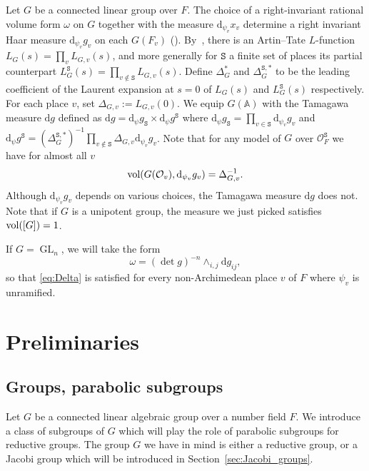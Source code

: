 \documentclass[letterpaper,11pt]{amsart}
\newcommand{\bA}{\mathbb{A}}
\newcommand{\cO}{\mathcal{O}}
\newcommand{\rd}{\mathrm{d}}
\newcommand{\tS}{\mathtt{S}}
\newcommand{\<}{\negthickspace}
\DeclareMathOperator{\GL}{GL}
\theoremstyle{definition}
\theoremstyle{plain}
\theoremstyle{remark}
\numberwithin{equation}{section}
\begin{document}
Let $G$ be a connected linear group over $F$.
The choice of a right-invariant rational volume
form $\omega$ on $G$ together with the measure $\rd_{\psi_v} x_v$ determine a right invariant Haar measure $\rd_{\psi_v} g_v$ on each $G(F_v)$ (\cite{Wei}).
By~\cite{Gro97}, there is an Artin--Tate $L$-function $L_{G}(s)=\prod_v
L_{G,v}(s)$, and more generally for $\tS$ a finite set of places its partial counterpart $L_{G}^{\tS}(s)=\prod_{v \notin \tS}
L_{G,v}(s)$. Define $\Delta_{G}^*$ and
$\Delta_{G}^{\tS,*}$ to be the leading coefficient of the Laurent expansion
at $s=0$ of $L_{G}(s)$ and $L_{G}^{\tS}(s)$ respectively. For each place $v$,
set $\Delta_{G,v}:=L_{G,v}(0)$. We equip $G(\bA)$ with the Tamagawa
measure $\rd g$ defined as $\rd g=\rd_\psi g_{\tS} \times \rd_\psi g^{\tS}$ where $\rd_\psi
g_{\tS}=\prod_{v \in \tS} \rd_{\psi_v} g_v$ and $\rd_\psi g^{\tS}=(\Delta_{G}^{\tS,*})^{-1}\prod_{v
\notin \tS} \Delta_{G,v} \rd_{\psi_v} g_v$. Note that for any model of $G$ over
$\cO_F^{\tS}$ we have for almost all $v$
\begin{equation}
\label{eq:Delta}
    \vol(G(\cO_v),\rd_{\psi_v} g_v)=\Delta_{G,v}^{-1}.
\end{equation}
Although $\rd_{\psi_v} g_v$ depends on various choices, the Tamagawa measure $\rd g$ does not. Note that if $G$ is a unipotent group, the measure we just picked satisfies $\operatorname{vol}([G]) = 1$.

If $G=\GL_n$, we will take the form
\begin{equation*}
    \omega=( \det g)^{-n}  \wedge_{i,j} \rd g_{ij},
\end{equation*}
so that \eqref{eq:Delta} is satisfied for every non-Archimedean place $v$ of $F$ where $\psi_v$ is unramified.




\section{Preliminaries}


\subsection{Groups, parabolic subgroups} \label{subsubsec:D-parabolic}


Let $G$ be a connected linear algebraic group over a number field $F$. We introduce a class of
subgroups of $G$ which will play the role of parabolic subgroups for
reductive groups. The group $G$ we have in mind is either a reductive group,
or a Jacobi group which will be introduced in
Section~\ref{sec:Jacobi_groups}.
\end{document}
